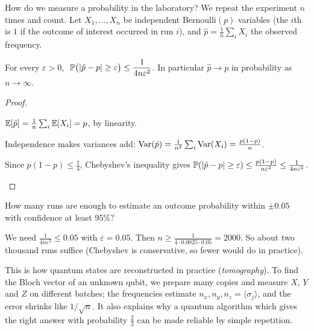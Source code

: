 How do we measure a probability in the laboratory? We repeat the experiment $n$ times and count. Let $X_1,\dots,X_n$ be independent Bernoulli$(p)$ variables (the $i$th is $1$ if the outcome of interest occurred in run $i$), and $\hat p=\frac1n\sum_iX_i$ the observed frequency.

\begin{theorem}\label{thm:wlln}
  For every $\varepsilon>0$, $\ \mathbb{P}\bigl(\left|\hat p-p\right|\ge\varepsilon\bigr)\le\dfrac{1}{4n\varepsilon^2}$. In particular $\hat p\to p$ in probability as $n\to\infty$.
\end{theorem}
\begin{proof}
  \begin{steps}
    \item $\mathbb{E}[\hat p]=\frac1n\sum_i\mathbb{E}[X_i]=p$, by linearity.
    \item Independence makes variances add: $\operatorname{Var}(\hat p)=\frac1{n^2}\sum_i\operatorname{Var}(X_i)=\frac{p(1-p)}n$.
    \item Since $p(1-p)\le\tfrac14$, Chebyshev's inequality gives $\mathbb{P}(\left|\hat p-p\right|\ge\varepsilon)\le\frac{p(1-p)}{n\varepsilon^2}\le\frac1{4n\varepsilon^2}$. \qedhere
  \end{steps}
\end{proof}

\begin{example}\label{ex:sample-size}
  How many runs are enough to estimate an outcome probability within $\pm0.05$ with confidence at least $95\%$?
\end{example}
\begin{solution}
  We need $\frac1{4n\varepsilon^2}\le0.05$ with $\varepsilon=0.05$. Then $n\ge\frac1{4\cdot0.0025\cdot0.05}=2000$. So about two thousand runs suffice (Chebyshev is conservative, so fewer would do in practice).
\end{solution}

\begin{lookahead}
  This is how quantum states are reconstructed in practice (\emph{tomography}). To find the Bloch vector of an unknown qubit, we prepare many copies and measure $X$, $Y$ and $Z$ on different batches; the frequencies estimate $n_x,n_y,n_z=\langle\sigma_j\rangle$, and the error shrinks like $1/\sqrt n$. It also explains why a quantum algorithm which gives the right answer with probability $\tfrac23$ can be made reliable by simple repetition.
\end{lookahead}

